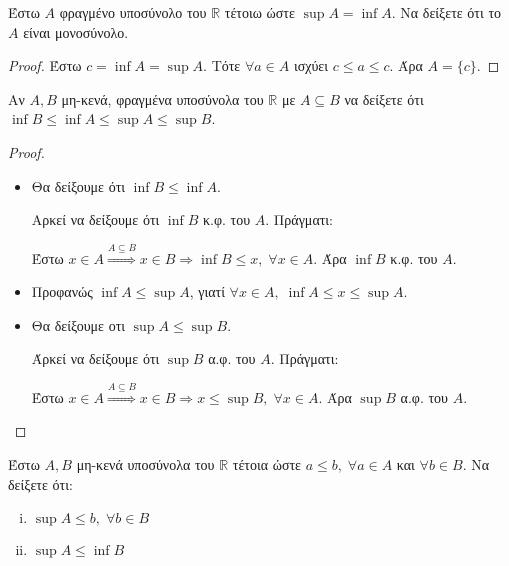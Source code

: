 \begin{multicols}{2}
\begin{enumerate}
\begin{enumerate}[i)]
            \end{enumerate}

        \pagebreak

        \item \textcolor{Col1}{Έστω $A$ φραγμένο υποσύνολο του $ \mathbb{R} $ τέτοιω ώστε $ \sup A = \inf A $.
            Να δείξετε ότι το $A$ είναι μονοσύνολο.}

            \begin{proof}
            \item {}
                Έστω $ c = \inf A = \sup A $. Τότε $ \forall a \in A $ ισχύει $ c \leq a \leq c
                $. Άρα $ A = \{ c \} $.
            \end{proof}

        \item \textcolor{Col1}{Αν $ A, B $ μη-κενά, φραγμένα υποσύνολα του $ \mathbb{R} $ με $ A \subseteq B $ να δείξετε ότι $ \inf B \leq \inf A \leq \sup A \leq \sup B $.}

            \begin{proof}
            \item {} 
                \begin{itemize}
                    \item Θα δείξουμε ότι $ \inf B \leq \inf A $. 

                        Αρκεί να δείξουμε ότι $ \inf B $ κ.φ. του $A$. Πράγματι:

                        Έστω $ x \in A \overset{A \subseteq B}{\Rightarrow} x \in B \Rightarrow 
                        \inf B \leq x, \; \forall x \in A $. Άρα $ \inf B $ κ.φ. του $A$.

                    \item Προφανώς $ \inf A \leq \sup A $, γιατί $ \forall x \in A, \; 
                        \inf A \leq x \leq \sup A $.

                    \item Θα δείξουμε οτι $ \sup A \leq \sup B $. 

                        Άρκεί να δείξουμε ότι $ \sup B $ α.φ. του $A$. Πράγματι:

                        Έστω $ x \in A \overset{A \subseteq B}{\Rightarrow} x \in B \Rightarrow 
                        x \leq \sup B, \; \forall x \in A $.  Άρα $ \sup B $ α.φ. του $A$.
                \end{itemize}
            \end{proof}

        \item \textcolor{Col1}{Έστω $ A, B $ μη-κενά υποσύνολα του $ \mathbb{R} $ τέτοια ώστε 
                $ a \leq b, \; \forall a \in A $ και $ \forall b \in B $.
                Να δείξετε ότι:
                \begin{enumerate}[i)]
                    \item $ \sup A \leq b, \;  \forall b \in B $
                    \item $ \sup A \leq \inf B $
            \end{enumerate}}


\end{enumerate}
\end{multicols}
